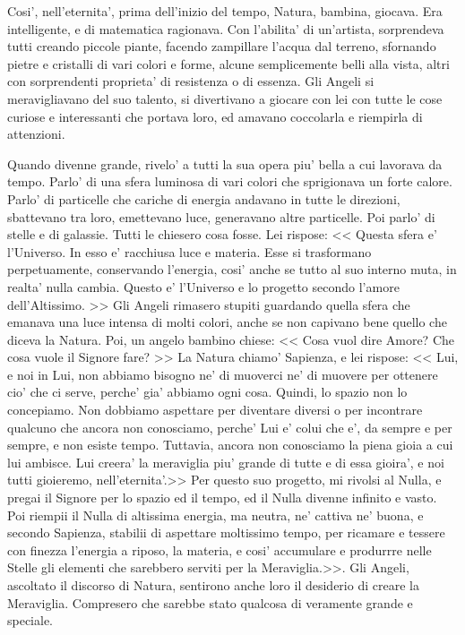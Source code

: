 Cosi', nell'eternita', prima dell'inizio del tempo, Natura, bambina, giocava. Era intelligente, e di matematica ragionava. Con l'abilita' di un'artista, sorprendeva tutti creando piccole piante, facendo zampillare l'acqua dal terreno, sfornando pietre e cristalli di vari colori e forme, alcune semplicemente belli alla vista, altri con sorprendenti proprieta' di resistenza o di essenza.
Gli Angeli si meravigliavano del suo talento, si divertivano a giocare con lei con tutte le cose curiose e interessanti che portava loro, ed amavano coccolarla e riempirla di attenzioni.

Quando divenne grande, rivelo' a tutti la sua opera piu' bella a cui lavorava da tempo. Parlo' di una sfera luminosa di vari colori che sprigionava un forte calore. Parlo' di particelle che cariche di energia andavano in tutte le direzioni, sbattevano tra loro, emettevano luce, generavano altre particelle. Poi parlo' di stelle e di galassie.
Tutti le chiesero cosa fosse.
Lei rispose: << 
  Questa sfera e' l'Universo. In esso e' racchiusa luce e materia. Esse si trasformano perpetuamente, conservando l'energia, cosi' anche se tutto al suo interno muta, in realta' nulla cambia. Questo e' l'Universo e lo progetto secondo l'amore dell'Altissimo.
>>
Gli Angeli rimasero stupiti guardando quella sfera che emanava una luce intensa di molti colori, anche se non capivano bene quello che diceva la Natura.
Poi, un angelo bambino chiese: << Cosa vuol dire Amore? Che cosa vuole il Signore fare? >>
La Natura chiamo' Sapienza, e lei rispose: <<
  Lui, e noi in Lui, non abbiamo bisogno ne' di muoverci ne' di muovere per ottenere cio' che ci serve, perche' gia' abbiamo ogni cosa. Quindi, lo spazio non lo concepiamo. Non dobbiamo aspettare per diventare diversi o per incontrare qualcuno che ancora non conosciamo, perche' Lui e' colui che e', da sempre e per sempre, e non esiste tempo. Tuttavia, ancora non conosciamo la piena gioia a cui lui ambisce. Lui creera' la meraviglia piu' grande di tutte e di essa gioira', e noi tutti gioieremo, nell'eternita'.>>
Per questo suo progetto, mi rivolsi al Nulla, e pregai il Signore per lo spazio ed il tempo, ed il Nulla divenne infinito e vasto. Poi riempii il Nulla di altissima energia, ma neutra, ne' cattiva ne' buona, e secondo Sapienza, stabilii di aspettare moltissimo tempo, per ricamare e tessere con finezza l'energia a riposo, la materia, e cosi' accumulare e produrrre nelle Stelle gli elementi che sarebbero serviti per la Meraviglia.>>.
  Gli Angeli, ascoltato il discorso di Natura, sentirono anche loro il desiderio di creare la Meraviglia. Compresero che sarebbe stato qualcosa di veramente grande e speciale.
